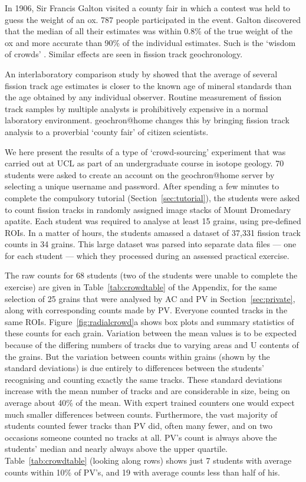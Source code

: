 \documentclass[gchron, manuscript]{copernicus}
\begin{document}
In 1906, Sir Francis Galton visited a county fair in which a contest
was held to guess the weight of an ox. 787 people participated in the
event. Galton discovered that the median of all their estimates was
within 0.8\% of the true weight of the ox and more accurate than 90\%
of the individual estimates. Such is the `wisdom of crowds'
\citep{galton1907a}. Similar effects are seen in fission track
geochronology.\medskip

An interlaboratory comparison study by \citet{miller1985} showed that
the average of several fission track age estimates is closer to the
known age of mineral standards than the age obtained by any individual
observer. Routine measurement of fission track samples by multiple
analysts is prohibitively expensive in a normal laboratory
environment. geochron@home changes this by bringing fission track
analysis to a proverbial `county fair' of citizen scientists.\medskip

We here present the results of a type of `crowd-sourcing' experiment
that was carried out at UCL as part of an undergraduate course in
isotope geology. 70 students were asked to create an account on the
geochron@home server by selecting a unique username and
password. After spending a few minutes to complete the compulsory
tutorial (Section~\ref{sec:tutorial}), the students were asked to
count fission tracks in randomly assigned image stacks of Mount
Dromedary apatite. Each student was required to analyse at least 15
grains, using pre-defined ROIs. In a matter of hours, the students
amassed a dataset of 37,331 fission track counts in 34 grains.  This
large dataset was parsed into separate data files --- one for each
student --- which they processed during an assessed practical
exercise.\medskip

The raw counts for 68 students (two of the students were unable to
complete the exercise) are given in Table~\ref{tab:crowdtable} of the
Appendix, for the same selection of 25 grains that were analysed by AC
and PV in Section~\ref{sec:private}, along with corresponding counts
made by PV. Everyone counted tracks in the same ROIs.
Figure~\ref{fig:radialcrowd}a shows box plots and summary statistics
of these counts for each grain.  Variation between the mean values is
to be expected because of the differing numbers of tracks due to
varying areas and U contents of the grains. But the variation between
counts within grains (shown by the standard deviations) is due
entirely to differences between the students’ recognising and counting
exactly the same tracks. These standard deviations increase with the
mean number of tracks and are considerable in size, being on average
about 40\% of the mean. With expert trained counters one would expect
much smaller differences between counts.  Furthermore, the vast
majority of students counted fewer tracks than PV did, often many
fewer, and on two occasions someone counted no tracks at all. PV's
count is always above the students' median and nearly always above the
upper quartile.  Table~\ref{tab:crowdtable} (looking along rows) shows
just 7 students with average counts within 10\% of PV's, and 19 with
average counts less than half of his.\medskip
\end{document}
